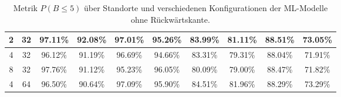 \begin{table}[h!]
\begin{tabular}{ | c | c | c | c | c | c | c | c | c | c | }
        2 & 32 & 97.11\% & 92.08\% & 97.01\% & 95.26\% & 83.99\% & 81.11\% & 88.51\% & 73.05\% \\\hline
        4 & 32 & 96.12\% & 91.19\% & 96.69\% & 94.66\% & 83.31\% & 79.31\% & 88.04\% & 71.91\% \\\hline
        8 & 32 & 97.76\% & 91.12\% & 95.23\% & 96.05\% & 80.09\% & 79.00\% & 88.47\% & 71.82\% \\\hline
        4 & 64 & 96.50\% & 90.64\% & 97.09\% & 95.90\% & 84.51\% & 81.96\% & 88.29\% & 73.29\% \\\hline
    \end{tabular}
    \caption{Metrik $P(B\leq5)$ über Standorte und verschiedenen Konfigurationen der ML-Modelle ohne Rückwärtskante.}
    \label{tab:predictions_by_acc_5_wo_fb}
\end{table}

